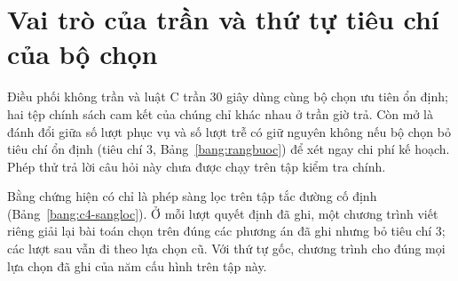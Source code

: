 
\section{Vai trò của trần và thứ tự tiêu chí của bộ chọn}
\label{muc:c4-vaitro}

Điều phối không trần và luật C trần 30 giây dùng cùng bộ chọn ưu tiên ổn định; hai tệp chính sách cam kết của chúng
chỉ khác nhau ở trần giờ trả. Còn mở là đánh đổi giữa số lượt phục vụ và số lượt trễ có giữ nguyên không nếu bộ chọn
bỏ tiêu chí ổn định (tiêu chí 3, Bảng~\ref{bang:rangbuoc}) để xét ngay chi phí kế hoạch. Phép thử trả lời câu hỏi này
chưa được chạy trên tập kiểm tra chính.

Bằng chứng hiện có chỉ là phép sàng lọc trên tập tắc đường cố định (Bảng~\ref{bang:c4-sangloc}). Ở mỗi lượt quyết định
đã ghi, một chương trình viết riêng giải lại bài toán chọn trên đúng các phương án đã ghi nhưng bỏ tiêu chí 3; các lượt
sau vẫn đi theo lựa chọn cũ. Với thứ tự gốc, chương trình cho đúng mọi lựa chọn đã ghi của năm cấu hình trên tập này.

